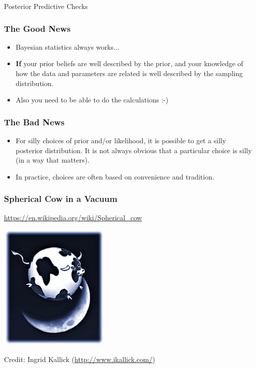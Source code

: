 \documentclass{beamer}
\begin{document}
\begin{frame}
\centering
\Large
Posterior Predictive Checks

\end{frame}


\begin{frame}
\frametitle{The Good News}
\begin{itemize}
\item Bayesian statistics always works...\pause
\item {\bf If} your prior beliefs are well described by the prior,
and your knowledge of how the data and parameters are related is well described
by the sampling distribution.\pause
\item Also you need to be able to do the calculations :-)
\end{itemize}


\end{frame}


\begin{frame}
\frametitle{The Bad News}
\begin{itemize}
\item For silly choices of prior and/or likelihood, it is possible to get
a silly posterior distribution. It is not always obvious that a particular choice
is silly (in a way that matters).\pause
\item In practice, choices are often based on convenience and tradition.
\end{itemize}


\end{frame}


\begin{frame}
\frametitle{Spherical Cow in a Vacuum}
\url{https://en.wikipedia.org/wiki/Spherical_cow}

\begin{center}
\includegraphics[width=0.4\textwidth]{images/spherical_cow.png}

Credit: Ingrid Kallick (\url{http://www.ikallick.com/})
\end{center}


\end{frame}
\end{document}
